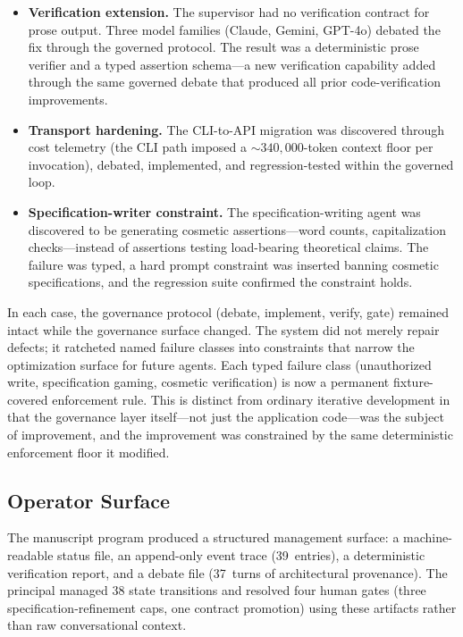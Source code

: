 \documentclass[11pt]{article}
\begin{document}
\begin{itemize}[nosep]
\item \textbf{Verification extension.} The supervisor had no verification contract for prose output. Three model families (Claude, Gemini, GPT-4o) debated the fix through the governed protocol. The result was a deterministic prose verifier and a typed assertion schema---a new verification capability added through the same governed debate that produced all prior code-verification improvements.
\item \textbf{Transport hardening.} The CLI-to-API migration was discovered through cost telemetry (the CLI path imposed a ${\sim}340{,}000$-token context floor per invocation), debated, implemented, and regression-tested within the governed loop.
\item \textbf{Specification-writer constraint.} The specification-writing agent was discovered to be generating cosmetic assertions---word counts, capitalization checks---instead of assertions testing load-bearing theoretical claims. The failure was typed, a hard prompt constraint was inserted banning cosmetic specifications, and the regression suite confirmed the constraint holds.
\end{itemize}

In each case, the governance protocol (debate, implement, verify, gate) remained intact while the governance surface changed. The system did not merely repair defects; it ratcheted named failure classes into constraints that narrow the optimization surface for future agents. Each typed failure class (unauthorized write, specification gaming, cosmetic verification) is now a permanent fixture-covered enforcement rule. This is distinct from ordinary iterative development in that the governance layer itself---not just the application code---was the subject of improvement, and the improvement was constrained by the same deterministic enforcement floor it modified.

\subsection{Operator Surface}

The manuscript program produced a structured management surface: a machine-readable status file, an append-only event trace (39~entries), a deterministic verification report, and a debate file (37~turns of architectural provenance). The principal managed 38 state transitions and resolved four human gates (three specification-refinement caps, one contract promotion) using these artifacts rather than raw conversational context.
\end{document}
